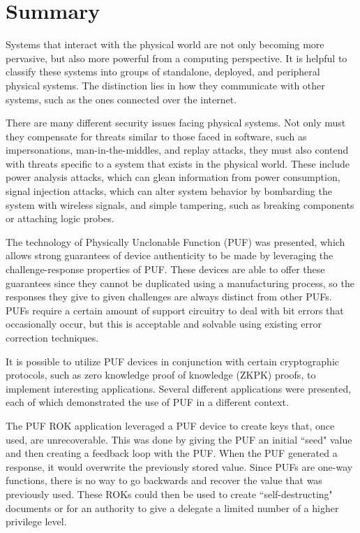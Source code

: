 %
%

\chapter{Summary}
\label{chapter:conclusion}

Systems that interact with the physical world are not only becoming more pervasive, but also more powerful
from a computing perspective. It is helpful to classify these systems into groups of standalone, deployed, and
peripheral physical systems. The distinction lies in how they communicate with other systems,
such as the ones connected over the internet.

There are many different security issues facing physical systems. Not only must they compensate for threats similar
to those faced in software, such as impersonations, man-in-the-middles, and replay attacks, they must also
contend with threats specific to a system that exists in the physical world. These include power analysis attacks,
which can glean information from power consumption, signal injection attacks, which can alter system behavior by
bombarding the system with wireless signals, and simple tampering, such as breaking components or attaching logic
probes.

The technology of Physically Unclonable Function (PUF) was presented, which allows strong guarantees of device authenticity
to be made by leveraging the challenge-response properties of PUF. These devices are able to offer these guarantees
since they cannot be duplicated using a manufacturing process, so the responses they give to given challenges are
always distinct from other PUFs. PUFs require a certain amount of support circuitry to deal with bit errors that occasionally
occur, but this is acceptable and solvable using existing error correction techniques.

It is possible to utilize PUF devices in conjunction with certain cryptographic protocols, such as zero knowledge proof
of knowledge (ZKPK) proofs, to implement interesting applications. Several different applications were presented, each of
which demonstrated the use of PUF in a different context.

The PUF ROK application leveraged a PUF device to create keys that, once used, are unrecoverable. This was done by
giving the PUF an initial ``seed" value and then creating a feedback loop with the PUF. When the PUF generated a response,
it would overwrite the previously stored value. Since PUFs are one-way functions, there is no way to go backwards and
recover the value that was previously used. These ROKs could then be used to create ``self-destructing" documents
or for an authority to give a delegate a limited number of a higher privilege level.

